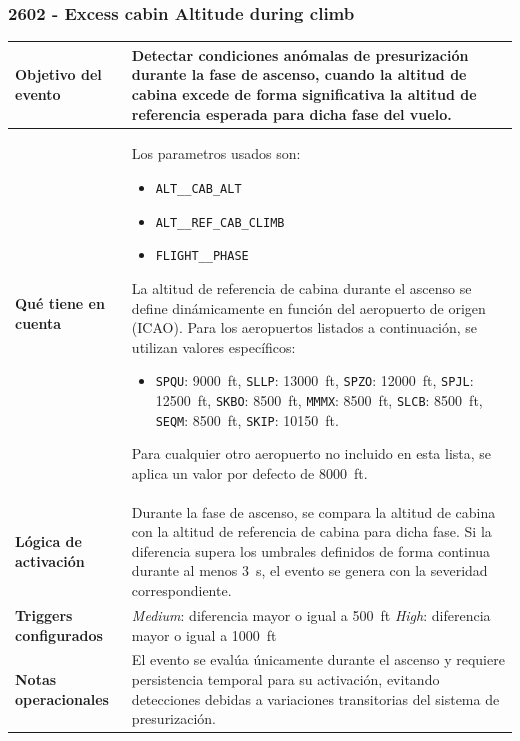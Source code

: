 \documentclass[11pt,a4paper]{article}
\begin{document}
	\subsubsection{2602 - Excess cabin Altitude during climb}
	\begin{table}[H]
		\centering
		\renewcommand{\arraystretch}{1.3}
		\begin{tabular}{p{5cm} p{9.5cm}}
			\hline
			\textbf{Objetivo del evento} &
			Detectar condiciones anómalas de presurización durante la fase de ascenso, cuando la altitud de cabina excede de forma significativa la altitud de referencia esperada para dicha fase del vuelo. \\
			\hline
			\textbf{Qué tiene en cuenta} & Los parametros usados son:
			\begin{itemize}
				\item \texttt{ALT\_\_CAB\_ALT}
				\item \texttt{ALT\_\_REF\_CAB\_CLIMB}
				\item \texttt{FLIGHT\_\_PHASE}
			\end{itemize}
			La altitud de referencia de cabina durante el ascenso se define dinámicamente en función del aeropuerto de origen (ICAO). Para los aeropuertos listados a continuación, se utilizan valores específicos:
			\begin{itemize}
				\item \texttt{SPQU}: \SI{9000}{ft}, \texttt{SLLP}: \SI{13000}{ft},
				\texttt{SPZO}: \SI{12000}{ft}, \texttt{SPJL}: \SI{12500}{ft},
				\texttt{SKBO}: \SI{8500}{ft}, \texttt{MMMX}: \SI{8500}{ft},
				\texttt{SLCB}: \SI{8500}{ft}, \texttt{SEQM}: \SI{8500}{ft},
				\texttt{SKIP}: \SI{10150}{ft}.
			\end{itemize}
			Para cualquier otro aeropuerto no incluido en esta lista, se aplica un valor por defecto de \SI{8000}{ft}. \\
			\hline
			\textbf{Lógica de activación} &
			Durante la fase de ascenso, se compara la altitud de cabina con la altitud de referencia de cabina para dicha fase. Si la diferencia supera los umbrales definidos de forma continua durante al menos \SI{3}{\second}, el evento se genera con la severidad correspondiente. \\
			\hline
			\textbf{Triggers configurados} &
			\textit{Medium}: diferencia mayor o igual a \SI{500}{ft} \newline
			\textit{High}: diferencia mayor o igual a \SI{1000}{ft} \\
			\hline
			\textbf{Notas operacionales} &
			El evento se evalúa únicamente durante el ascenso y requiere persistencia temporal para su activación, evitando detecciones debidas a variaciones transitorias del sistema de presurización. \\
			\hline
		\end{tabular}
	\end{table}
	
\end{document}
